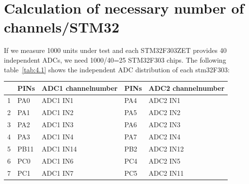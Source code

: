 \section{Calculation of necessary number of channels/STM32}
\label{sec:Calculation of necessary number of channels/STM32}
If we measure 1000 units under test and each STM32F303ZET provides 40
independent ADCs, we need 1000/40=25 STM32F303 chips. The following
table~\ref{tab:4.1} shows the independent ADC distribution of each stm32F303:

\begin{table}[]
\begin{tabular}{@{}lllll@{}}
\toprule
\rowcolor[HTML]{EFEFEF} 
\multicolumn{1}{|l|}{\cellcolor[HTML]{EFEFEF}Quantity} & \multicolumn{1}{l|}{\cellcolor[HTML]{EFEFEF}PINs} & \multicolumn{1}{l|}{\cellcolor[HTML]{EFEFEF}ADC1 channelnumber} & \multicolumn{1}{l|}{\cellcolor[HTML]{EFEFEF}PINs} & \multicolumn{1}{l|}{\cellcolor[HTML]{EFEFEF}ADC2 channelnumber} \\ \hline
\multicolumn{1}{|l|}{\cellcolor[HTML]{EFEFEF}1} & \multicolumn{1}{l|}{PA0} & \multicolumn{1}{l|}{ADC1 IN1} & \multicolumn{1}{l|}{PA4} & \multicolumn{1}{l|}{ADC2 IN1} \\ \midrule
\multicolumn{1}{|l|}{\cellcolor[HTML]{EFEFEF}2} & \multicolumn{1}{l|}{PA1} & \multicolumn{1}{l|}{ADC1 IN2} & \multicolumn{1}{l|}{PA5} & \multicolumn{1}{l|}{ADC2 IN2} \\ \midrule
\multicolumn{1}{|l|}{\cellcolor[HTML]{EFEFEF}3} & \multicolumn{1}{l|}{PA2} & \multicolumn{1}{l|}{ADC1 IN3} & \multicolumn{1}{l|}{PA6} & \multicolumn{1}{l|}{ADC2 IN3} \\ \midrule
\multicolumn{1}{|l|}{\cellcolor[HTML]{EFEFEF}4} & \multicolumn{1}{l|}{PA3} & \multicolumn{1}{l|}{ADC1 IN4} & \multicolumn{1}{l|}{PA7} & \multicolumn{1}{l|}{ADC2 IN4} \\ \midrule
\multicolumn{1}{|l|}{\cellcolor[HTML]{EFEFEF}5} & \multicolumn{1}{l|}{PB11} & \multicolumn{1}{l|}{ADC1 IN14} & \multicolumn{1}{l|}{PB2} & \multicolumn{1}{l|}{ADC2 IN12} \\ \midrule
\multicolumn{1}{|l|}{\cellcolor[HTML]{EFEFEF}6} & \multicolumn{1}{l|}{PC0} & \multicolumn{1}{l|}{ADC1 IN6} & \multicolumn{1}{l|}{PC4} & \multicolumn{1}{l|}{ADC2 IN5} \\ \midrule
\multicolumn{1}{|l|}{\cellcolor[HTML]{EFEFEF}7} & \multicolumn{1}{l|}{PC1} & \multicolumn{1}{l|}{ADC1 IN7} & \multicolumn{1}{l|}{PC5} & \multicolumn{1}{l|}{ADC2 IN11} \\ \midrule

\end{tabular}
\end{table}
